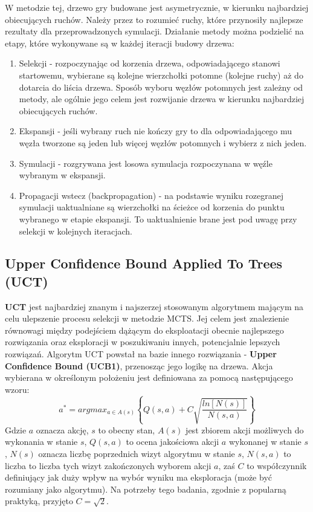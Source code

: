 \documentclass[10pt]{article}
\begin{document}
W metodzie tej, drzewo gry budowane jest asymetrycznie, w kierunku najbardziej obiecujących ruchów. Należy przez to rozumieć ruchy, które przynosiły najlepsze rezultaty dla przeprowadzonych symulacji. Działanie metody można podzielić na etapy, które wykonywane są w każdej iteracji budowy drzewa:
\begin{enumerate}
    \item Selekcji - rozpoczynając od korzenia drzewa, odpowiadającego stanowi startowemu, wybierane są kolejne wierzchołki potomne (kolejne ruchy) aż do dotarcia do liścia drzewa. Sposób wyboru węzłów potomnych jest zależny od metody, ale ogólnie jego celem jest rozwijanie drzewa w kierunku najbardziej obiecujących ruchów.
    \item Ekspansji - jeśli wybrany ruch nie kończy gry to dla odpowiadającego mu węzła tworzone są jeden lub więcej węzłów potomnych i wybierz z nich jeden.
    \item Symulacji - rozgrywana jest losowa symulacja rozpoczynana w węźle wybranym w ekspansji.
    \item Propagacji wstecz (backpropagation) - na podstawie wyniku rozegranej symulacji uaktualniane są wierzchołki na ścieżce od korzenia do punktu wybranego w etapie ekspansji. To uaktualnienie brane jest pod uwagę przy selekcji w kolejnych iteracjach.
\end{enumerate}

\subsection{Upper Confidence Bound Applied To Trees (UCT)}
\label{sec:uct}
\textbf{UCT} jest najbardziej znanym i najszerzej stosowanym algorytmem mającym na celu ulepszenie procesu selekcji w metodzie MCTS. Jej celem jest znalezienie równowagi między podejściem dążącym do eksploatacji obecnie najlepszego rozwiązania oraz eksploracji w poszukiwaniu innych, potencjalnie lepszych rozwiązań. Algorytm UCT powstał na bazie innego rozwiązania - \textbf{Upper Confidence Bound (UCB1)}, przenosząc jego logikę na drzewa. Akcja wybierana w określonym położeniu jest definiowana za pomocą następującego wzoru:
\begin{equation}\label{eq:uct}
    a^* = arg max_{a \in A(s)} \left\{ Q(s,a) + C \sqrt{\frac{ln[N(s)]}{N(s,a)}} \right\}
\end{equation}
Gdzie $a$ oznacza akcję, $s$ to obecny stan, $A(s)$ jest zbiorem akcji możliwych do wykonania w stanie $s$, $Q(s,a)$ to ocena jakościowa akcji $a$ wykonanej w stanie $s$, $N(s)$ oznacza liczbę poprzednich wizyt algorytmu w stanie $s$, $N(s,a)$ to liczba to liczba tych wizyt zakończonych wyborem akcji $a$, zaś $C$ to współczynnik definiujący jak duży wpływ na wybór wyniku ma eksploracja (może być rozumiany jako  algorytmu). Na potrzeby tego badania, zgodnie z popularną praktyką, przyjęto $C = \sqrt{2}$.
\end{document}
